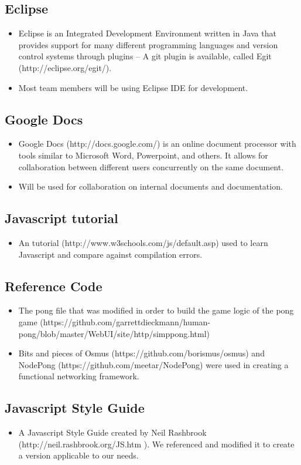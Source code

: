 \documentclass[letterpaper,12pt]{article}
\begin{document}
\subsection{Eclipse}
	\begin{itemize}
		\item Eclipse is an Integrated Development Environment written in Java that provides support for many different programming languages and version control systems through plugins -- A git plugin is available, called Egit (http://eclipse.org/egit/).
		\item Most team members will be using Eclipse IDE for development.
	\end{itemize}
\subsection{Google Docs}
	\begin{itemize}
		\item Google Docs (http://docs.google.com/) is an online document processor with tools similar to Microsoft Word, Powerpoint, and others. It allows for collaboration between different users concurrently on the same document.
		\item Will be used for collaboration on internal documents and documentation.
	\end{itemize}
\subsection{Javascript tutorial}
\begin{itemize}
\item An tutorial (http://www.w3schools.com/js/default.asp) used to learn Javascript and compare against compilation errors.
\end{itemize}

\subsection{Reference Code}

\begin{itemize}
\item The pong file that was modified in order to build the game logic of the pong game (https://github.com/garrettdieckmann/human-pong/blob/master/WebUI/site/http/simppong.html)
\item Bits and pieces of Osmus (https://github.com/borismus/osmus) and NodePong (https://github.com/meetar/NodePong) were used in creating a functional networking framework.
\end{itemize}
\subsection{Javascript Style Guide}
\begin{itemize}
\item A Javascript Style Guide created by Neil Rashbrook (http://neil.rashbrook.org/JS.htm ). We referenced and modified it to create a version applicable to our needs.
\end{itemize}
\end{document}

